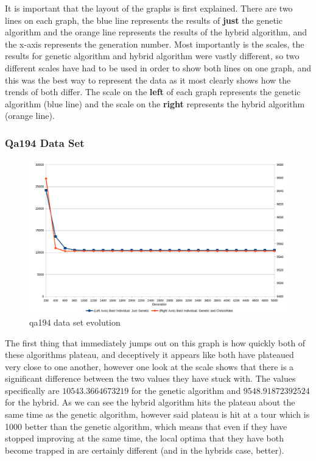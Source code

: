 \documentclass[11pt,a4paper,titlepage]{article}
\begin{document}
It is important that the layout of the graphs is first explained. There are two lines on each graph, the blue line represents the results of \textbf{just} the genetic algorithm and the orange line represents the results of the hybrid algorithm, and the x-axis represents the generation number. Most importantly is the scales, the results for genetic algorithm and hybrid algorithm were vastly different, so two different scales have had to be used in order to show both lines on one graph, and this was the best way to represent the data as it most clearly shows how the trends of both differ. The scale on the \textbf{left} of each graph represents the genetic algorithm (blue line) and the scale on the \textbf{right} represents the hybrid algorithm (orange line).

\subsubsection{Qa194 Data Set}

\begin{figure}[ht]
	\includegraphics[width=\textwidth]{qa194Evolution}
	\centering
	\caption{qa194 data set evolution}
\end{figure}


The first thing that immediately jumps out on this graph is how quickly both of these algorithms plateau, and deceptively it appears like both have plateaued very close to one another, however one look at the scale shows that there is a significant difference between the two values they have stuck with. The values specifically are $10543.3664673219$ for the genetic algorithm and $9548.91872392524$ for the hybrid. As we can see the hybrid algorithm hits the plateau about the same time as the genetic algorithm, however said plateau is hit at a tour which is 1000 better than the genetic algorithm, which means that even if they have stopped improving at the same time, the local optima that they have both become trapped in are certainly different (and in the hybrids case, better).
\end{document}
